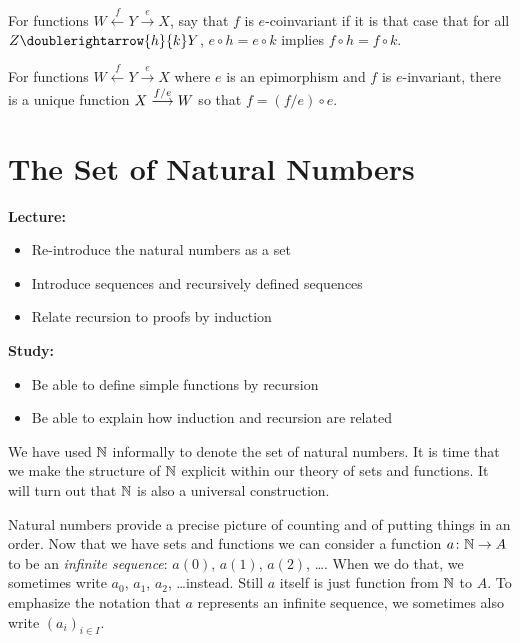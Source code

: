 \begin{defn}
	For functions $W\stackrel{f}{\longleftarrow}Y\stackrel{e}{\longrightarrow}X$, say that $f$ is {$e$-coinvariant} if it is that case that for all $Z\doublerightarrow{h}{k}Y$, $e\circ h=e\circ k$ implies $f\circ h = f\circ k$.
\end{defn}

\begin{lemma}
	For functions $W\stackrel{f}{\longleftarrow}Y\stackrel{e}{\longrightarrow}X$ where $e$ is an epimorphism and $f$ is $e$-invariant, there is a unique function $\sfromto {f/e}XW$ so that $f = (f/e)\circ e$.
\end{lemma}

\chapter{The Set of Natural Numbers}\label{lec:natural-numbers}

\begin{goals}
\noindent\textbf{Lecture:}
\begin{itemize}
	\item Re-introduce the natural numbers as a set
	\item Introduce sequences and recursively defined sequences
	\item Relate recursion to proofs by induction
\end{itemize}

\noindent\textbf{Study:}
\begin{itemize}
	\item Be able to define simple functions by recursion
	\item Be able to explain how induction and recursion are related
\end{itemize}
\end{goals}

We have used $\NN$ informally to denote the set of natural numbers. 
It is time that we make the structure of $\NN$ explicit within our theory of sets and functions. 
It will turn out that $\NN$ is also a universal construction. 

Natural numbers provide a precise picture of counting and of putting things in an order.
Now that we have sets and functions we can consider a function $\fromto a\NN A$ to be an \emph{infinite sequence}: $a(0)$, $a(1)$, $a(2)$, \ldots.
When we do that, we sometimes write $a_0$, $a_1$, $a_2$, \ldots instead.
Still $a$ itself is just function from $\NN$ to $A$.
To emphasize the notation that $a$ represents an infinite sequence, we sometimes also write $(a_i)_{i\in I}$.

